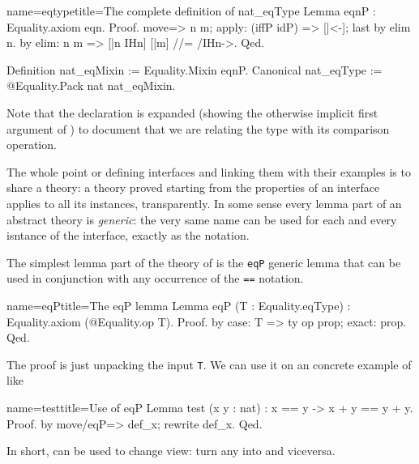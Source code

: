 \begin{coq}{name=eqtype}{title=The complete definition of nat\_eqType}
Lemma eqnP : Equality.axiom eqn.
Proof.
move=> n m; apply: (iffP idP) => [|<-]; last by elim n.
by elim: n m => [|n IHn] [|m] //= /IHn->.
Qed.

Definition nat_eqMixin := Equality.Mixin eqnP.
Canonical nat_eqType := @Equality.Pack nat nat_eqMixin.
\end{coq}

Note that the  declaration is expanded (showing the
otherwise implicit first argument of ) to document that
we are relating the type  with its comparison operation.

\mcbREQUIRE{}
\label{sec:eqtypetheory}

The whole point or defining interfaces and linking them with their
examples is to share a theory: a theory proved starting from the
properties of an interface applies to all its instances,
transparently.  In some sense every lemma part of an abstract theory
is \emph{generic}: the very same name can be used for each and every
isntance of the interface, exactly as the \C{==} notation.

The simplest lemma part of the theory of  is the
\lstinline/eqP/ generic lemma that can be used in conjunction with
any occurrence of the \lstinline/==/ notation.

\begin{coq}{name=eqP}{title=The eqP lemma}
Lemma eqP (T : Equality.eqType) : Equality.axiom (@Equality.op T).
Proof. by case: T => ty op prop; exact: prop. Qed.
\end{coq}

The proof is just unpacking the input \lstinline/T/.
We can use it on an concrete example of  like 

\begin{coq}{name=test}{title=Use of eqP}
Lemma test (x y : nat) : x == y -> x + y == y + y.
Proof. by move/eqP=> def_x; rewrite def_x. Qed.
\end{coq}

In short,  can be used to change view: turn any
\C{==} into \C{=} and viceversa.

